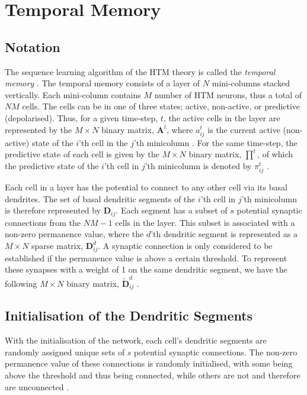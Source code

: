 \section{Temporal Memory}
\label{sec:TM}
\subsection{Notation}
The sequence learning algorithm of the HTM theory is called the \textit{temporal memory} \cite{10.3389/fncir.2016.00023}. The temporal memory consists of a layer of $N$ mini-columns stacked vertically. Each mini-column contains $M$ number of HTM neurons, thus a total of $NM$ cells. The cells can be in one of three states; active, non-active, or predictive (depolarised). Thus, for a given time-step, $t$, the active cells in the layer are represented by the $M \times N$ binary matrix, $\boldsymbol{A}^{t}$, where $a^{t}_{ij}$ is the current active (non-active) state of the $i$'th cell in the $j$'th minicolumn \cite{10.3389/fncir.2016.00023}. For the same time-step, the predictive state of each cell is given by the $M \times N$ binary matrix, $\boldsymbol{\prod}^{t}$, of which the predictive state of the $i$'th cell in $j$'th minicolumn is denoted by $\pi^{t}_{ij}$ \cite{10.3389/fncir.2016.00023}.


Each cell in a layer has the potential to connect to any other cell via its basal dendrites. The set of basal dendritic segments of the $i$'th cell in $j$'th minicolumn is therefore represented by $\boldsymbol{D}_{ij}$. Each segment has a subset of $s$ potential synaptic connections from the $NM - 1$ cells in the layer. This subset is associated with a non-zero permanence value, where the $d$'th dendritic segment is represented as a $M \times N$ sparse matrix, $\boldsymbol{D}^{d}_{ij}$. A synaptic connection is only considered to be established if the permanence value is above a certain threshold. To represent these synapses with a weight of 1 on the same dendritic segment, we have the following $M \times N$ binary matrix, $\tilde{\boldsymbol{D}}^{d}_{ij}$ \cite{10.3389/fncir.2016.00023}.

\subsection{Initialisation of the Dendritic Segments}
With the initialisation of the network, each cell's dendritic segments are randomly assigned unique sets of $s$ potential synaptic connections. The non-zero permanence value of these connections is randomly initialised, with some being above the threshold and thus being connected, while others are not and therefore are unconnected \cite{10.3389/fncir.2016.00023}.

